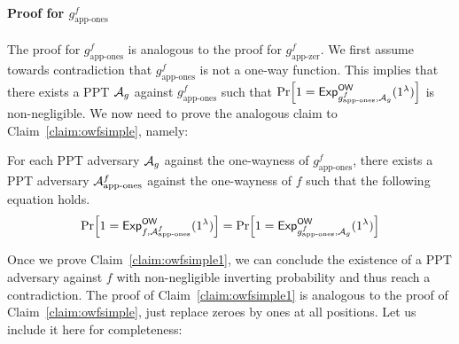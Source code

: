 \paragraph{Proof for $g^f_{\text{app-ones}}$} The proof for $g^f_{\text{app-ones}}$ is analogous to the proof for $g^f_{\text{app-zer}}$. We first assume towards contradiction that $g^f_{\text{app-ones}}$ is not a one-way function. This implies that there exists a PPT $\mathcal{A}_g$ against $g^f_{\text{app-ones}}$ such that $\prob{1={\mathsf{Exp}}_{g^f_{\text{app-ones}},\adv_g}^{\mathsf{OW}}(1^\lambda)}$ is non-negligible.
We now need to prove the analogous claim to Claim~\ref{claim:owfsimple}, namely:
\begin{claim}\label{claim:owfsimple1}
For each PPT adversary $\mathcal{A}_g$ against the one-wayness of $g^f_{\text{app-ones}}$, there exists a PPT adversary $\mathcal{A}^f_{\text{app-ones}}$ against the one-wayness of $f$ such that the following equation holds.
\begin{equation}\label{eq:reductionowfones}
\prob{1={\mathsf{Exp}}_{f,\adv^f_{\text{app-ones}}}^{\mathsf{OW}}(1^\lambda)}=\prob{1={\mathsf{Exp}}_{g^f_{\text{app-ones}},\adv_g}^{\mathsf{OW}}(1^\lambda)}
\end{equation}
\end{claim}
Once we prove Claim~\ref{claim:owfsimple1}, we can conclude the existence of a PPT adversary against $f$ with non-negligible inverting probability and thus reach a contradiction. The proof of Claim~\ref{claim:owfsimple1} is analogous to the proof of Claim~\ref{claim:owfsimple}, just replace zeroes by ones at all positions. Let us include it here for completeness:
